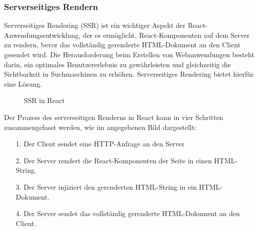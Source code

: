 \subsubsection{Serverseitiges Rendern}
Serverseitiges Rendering (SSR) ist ein wichtiger Aspekt der React-Anwendungsentwicklung, der es ermöglicht, React-Komponenten auf dem Server zu rendern, bevor das vollständig gerenderte HTML-Dokument an den Client gesendet wird.
Die Herausforderung beim Erstellen von Webanwendungen besteht darin, ein optimales Benutzererlebnis zu gewährleisten und gleichzeitig die Sichtbarkeit in Suchmaschinen zu erhöhen. Serverseitiges Rendering bietet hierfür eine Lösung.\\
\newpage
\begin{figure}[htbp]
	\centering
	\caption{SSR in React}
\end{figure}
Der Prozess des serverseitigen Renderns in React kann in vier Schritten zusammengefasst werden, wie im angegebenen Bild dargestellt:\\
\begin{itemize}
	\item[1.] {Der Client sendet eine HTTP-Anfrage an den Server}
	\item[2.]  {Der Server rendert die React-Komponenten der Seite in einen HTML-String.}
	\item[3.]  {Der Server injiziert den gerenderten HTML-String in ein HTML-Dokument.}
	\item[4.]  {Der Server sendet das vollständig gerenderte HTML-Dokument an den Client.}
\end{itemize}
